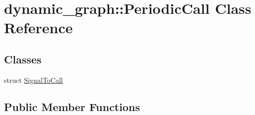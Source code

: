 \hypertarget{classdynamic__graph_1_1PeriodicCall}{}\section{dynamic\+\_\+graph\+:\+:Periodic\+Call Class Reference}
\label{classdynamic__graph_1_1PeriodicCall}
\subsection*{Classes}
\begin{DoxyCompactItemize}
\item 
struct \hyperlink{structdynamic__graph_1_1PeriodicCall_1_1SignalToCall}{Signal\+To\+Call}
\end{DoxyCompactItemize}
\subsection*{Public Member Functions}
